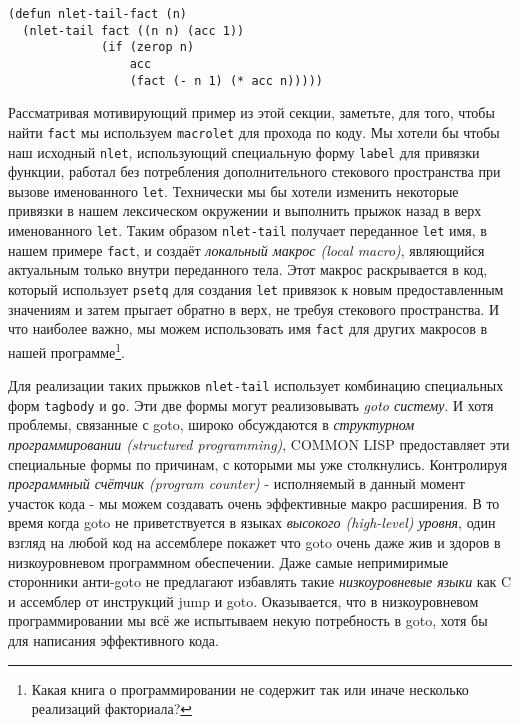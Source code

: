 \begin{verbatim}
(defun nlet-tail-fact (n)
  (nlet-tail fact ((n n) (acc 1))
             (if (zerop n)
                 acc
                 (fact (- n 1) (* acc n)))))
\end{verbatim}

Рассматривая мотивирующий пример из этой секции, заметьте, для того, чтобы найти \verb"fact" мы используем \verb"macrolet" для прохода по коду. Мы хотели бы чтобы наш исходный \verb"nlet", использующий специальную форму \verb"label" для привязки функции, работал без потребления дополнительного стекового пространства при вызове именованного \verb"let". Технически мы бы хотели изменить некоторые привязки в нашем лексическом окружении и выполнить прыжок назад в верх именованного \verb"let". Таким образом \verb"nlet-tail" получает переданное \verb"let" имя, в нашем примере \verb"fact", и создаёт \emph{локальный макрос (local macro)}, являющийся актуальным только внутри переданного тела. Этот макрос раскрывается в код, который использует \verb"psetq" для создания \verb"let" привязок к новым предоставленным значениям и затем прыгает обратно в верх, не требуя стекового пространства. И что наиболее важно, мы можем использовать имя \verb"fact" для других макросов в нашей программе\footnote{Какая книга о программировании не содержит так или иначе несколько реализаций факториала?}.



Для реализации таких прыжков \verb"nlet-tail" использует комбинацию специальных форм \verb"tagbody" и \verb"go". Эти две формы могут реализовывать \emph{goto систему}. И хотя проблемы, связанные с goto, широко обсуждаются в \emph{структурном программировании (structured programming)}, COMMON LISP предоставляет эти специальные формы по причинам, с которыми мы уже столкнулись. Контролируя \emph{программный счётчик (program counter)} - исполняемый в данный момент участок кода - мы можем создавать очень эффективные макро расширения. В то время когда goto не приветствуется в языках \emph{высокого (high-level) уровня}, один взгляд на любой код на ассемблере покажет что goto очень даже жив и здоров в низкоуровневом программном обеспечении. Даже самые непримиримые сторонники анти-goto не предлагают избавлять такие \emph{низкоуровневые языки} как C и ассемблер от инструкций jump и goto. Оказывается, что в низкоуровневом программировании мы всё же испытываем некую потребность в goto, хотя бы для написания эффективного кода.

